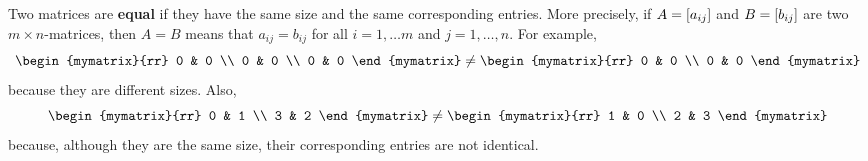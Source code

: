 Two matrices are \textbf{equal}%
 if they have the same size and the same
corresponding entries. More precisely, if $A=\left[a_{ij}\right]$ and
$B=\left[b_{ij}\right]$ are two $m\times n$-matrices, then $A=B$ means that
$a_{ij}=b_{ij}$ for all $i=1,\ldots m$ and $j=1,\ldots,n$.
For example, 
\begin{equation*}
\begin{mymatrix}{rr}
0 & 0 \\
0 & 0 \\
0 & 0
\end{mymatrix} \neq \begin{mymatrix}{rr}
0 & 0 \\
0 & 0
\end{mymatrix}
\end{equation*}
because they are different sizes.
Also,
\begin{equation*}
\begin{mymatrix}{rr}
0 & 1 \\
3 & 2
\end{mymatrix} \neq \begin{mymatrix}{rr}
1 & 0 \\
2 & 3
\end{mymatrix}
\end{equation*}
because, although they are the same size, their corresponding entries are not identical.

